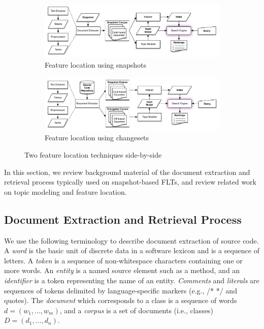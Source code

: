 
\begin{figure}[t]
    \centering
\begin{subfigure}[t]{.9\textwidth}
    \centerline{\includegraphics[width=\textwidth]{figures/snapshot-flt}}
    \caption{Feature location using snapshots}
    \label{fig:snapshot}
\end{subfigure}

\begin{subfigure}[b]{.9\textwidth}
    \centerline{\includegraphics[width=\textwidth]{figures/changeset-flt}}
\caption{Feature location using changesets}
\label{fig:changeset}
\end{subfigure}

\label{fig:flts}
\caption{Two feature location techniques side-by-side}
\end{figure}


In this section, we review background material of the document extraction and retrieval process
typically used on snapshot-based FLTs,
and review related work on topic modeling and feature location.

\subsection{Document Extraction and Retrieval Process}
\label{sec:snapshot-flt}

We use the following terminology to describe document extraction of source code.
A \textit{word} is the basic unit of discrete data in a software lexicon and is a sequence of letters.
A \textit{token} is a sequence of non-whitespace characters containing one or more words.
An \textit{entity} is a named source element such as a method,
and an \textit{identifier} is a token representing the name of an entity.
\textit{Comments} and \textit{literals} are sequences of tokens delimited by language-specific markers (e.g., /* */ and quotes).
The \textit{document} which corresponds to a class is a sequence of words $d = (w_1, \ldots, w_m)$,
and a \textit{corpus} is a set of documents (i.e., classes) $D = (d_1, \ldots, d_n)$.


